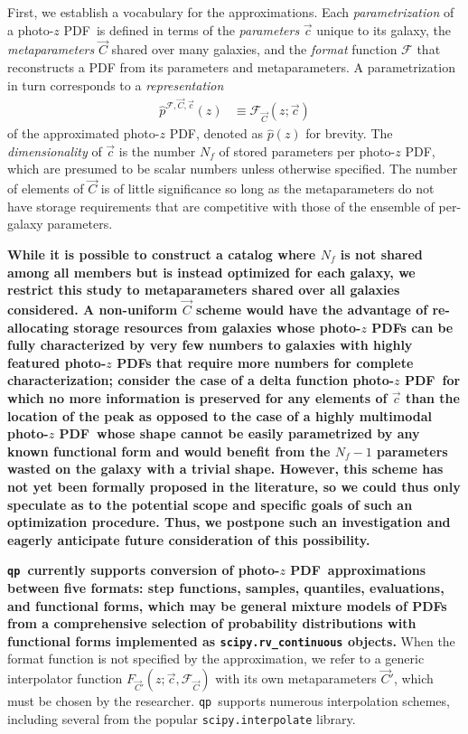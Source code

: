 \documentclass[\docopts]{\docclass}
\newcommand{\qp}{\texttt{qp}}
\newcommand{\pz}{photo-$z$ PDF}
\begin{document}
First, we establish a vocabulary for the approximations.
Each \textit{parametrization} of a \pz\ is defined in terms of the 
\textit{parameters} $\vec{c}$ unique to its galaxy, the \textit{metaparameters} 
$\vec{C}$ shared over many galaxies, and the \textit{format} function 
$\mathcal{F}$ that reconstructs a PDF from its parameters and metaparameters.
A parametrization in turn corresponds to a \textit{representation}
\begin{align}
  \label{eq:definition}
  \hat{p}^{\mathcal{F}, \vec{C}, \vec{c}}(z) &\equiv \mathcal{F}_{\vec{C}}(z; 
\vec{c})
\end{align}
of the approximated \pz, denoted as $\hat{p}(z)$ for brevity.
The \textit{dimensionality} of $\vec{c}$ is the number $N_{f}$ of stored 
parameters per \pz, which are presumed to be scalar numbers unless otherwise 
specified.
The number of elements of $\vec{C}$ is of little significance so long as the 
metaparameters do not have storage requirements that are competitive with those 
of the ensemble of per-galaxy parameters.

\textbf{While it is possible to construct a catalog where $N_{f}$ is not shared 
among all members but is instead optimized for each galaxy, we restrict this 
study to metaparameters shared over all galaxies considered.
A non-uniform $\vec{C}$ scheme would have the advantage of re-allocating 
storage resources from galaxies whose \pz s can be fully characterized by very 
few numbers to galaxies with highly featured \pz s that require more numbers 
for complete characterization; consider the case of a delta function \pz\ for 
which no more information is preserved for any elements of $\vec{c}$ than the 
location of the peak as opposed to the case of a highly multimodal \pz\ whose 
shape cannot be easily parametrized by any known functional form and would 
benefit from the $N_{f}-1$ parameters wasted on the galaxy with a trivial shape.
However, this scheme has not yet been formally proposed in the literature, so 
we could thus only speculate as to the potential scope and specific goals of 
such an optimization procedure.
Thus, we postpone such an investigation and eagerly anticipate future 
consideration of this possibility.}

\textbf{\qp\ currently supports conversion of \pz\ approximations between five 
formats: step functions, samples, quantiles, evaluations, and functional forms, 
which may be general mixture models of PDFs from a comprehensive selection of 
probability distributions with functional forms implemented as 
\texttt{scipy.rv\_continuous} objects.}
When the format function is not specified by the approximation, we refer to a 
generic interpolator function $F_{\vec{C}'}(z; \vec{c}, \mathcal{F}_{\vec{C}})$ 
with its own metaparameters $\vec{C}'$, which must be chosen by the researcher.
\qp\ supports numerous interpolation schemes, including several from the 
popular \texttt{scipy.interpolate} library.
\end{document}
